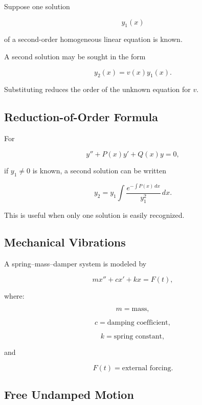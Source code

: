 Suppose one solution

\[
y_1(x)
\]

of a second-order homogeneous linear equation is known.

A second solution may be sought in the form

\[
\boxed{
y_2(x)
=
v(x)y_1(x).
}
\]

Substituting reduces the order of the unknown equation for \(v\).

\subsection{Reduction-of-Order Formula}
\label{subsec:reduction-order-formula}

For

\[
y''
+
P(x)y'
+
Q(x)y
=
0,
\]

if \(y_1\neq0\) is known, a second solution can be written

\[
\boxed{
y_2
=
y_1
\int
\frac{
e^{-\int P(x)\,dx}
}{
y_1^2
}
\,dx.
}
\]

This is useful when only one solution is easily recognized.

\subsection{Mechanical Vibrations}
\label{subsec:mechanical-vibrations}

A spring--mass--damper system is modeled by

\[
\boxed{
m x''
+
c x'
+
k x
=
F(t),
}
\]

where:

\[
m
=
\text{mass},
\]

\[
c
=
\text{damping coefficient},
\]

\[
k
=
\text{spring constant},
\]

and

\[
F(t)
=
\text{external forcing}.
\]

\subsection{Free Undamped Motion}
\label{subsec:free-undamped-motion}

